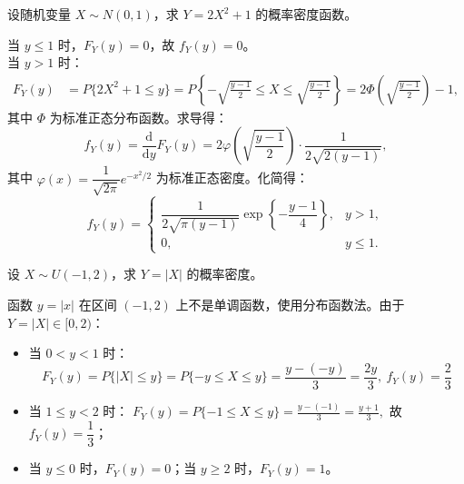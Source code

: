 \documentclass[lang=cn,11pt]{elegantbook}
\begin{document}
\begin{exercise}[正态分布平方变换] 
设随机变量 $X\sim N(0,1)$，求 $Y=2X^2+1$ 的概率密度函数。
\end{exercise}
\begin{solution}
当 $y\leqslant1$ 时，$F_Y(y)=0$，故 $f_Y(y)=0$。\\
当 $y>1$ 时：
\[
\begin{aligned}
F_Y(y) &= P\{2X^2+1\leqslant y\} = P\left\{-\sqrt{\frac{y-1}{2}}\leqslant X\leqslant\sqrt{\frac{y-1}{2}}\right\} = 2\Phi\left(\sqrt{\frac{y-1}{2}}\right)-1,
\end{aligned}
\]
其中 $\Phi$ 为标准正态分布函数。求导得：
\[
f_Y(y) = \frac{\mathrm{d}}{\mathrm{d}y}F_Y(y) = 2\varphi\left(\sqrt{\frac{y-1}{2}}\right)\cdot\frac{1}{2\sqrt{2(y-1)}},
\]
其中 $\varphi(x)=\dfrac{1}{\sqrt{2\pi}}e^{-x^2/2}$ 为标准正态密度。化简得：
\[
f_Y(y) =
\begin{cases}
\dfrac{1}{2\sqrt{\pi(y-1)}}\exp\left\{-\dfrac{y-1}{4}\right\}, & y>1, \\[8pt]
0, & y\leqslant1.
\end{cases}
\]
\end{solution}

\begin{exercise}[均匀分布绝对值变换] \label{exer:2-51}
设 $X\sim U(-1,2)$，求 $Y=|X|$ 的概率密度。
\end{exercise}
\begin{solution}
函数 $y=|x|$ 在区间 $(-1,2)$ 上不是单调函数，使用分布函数法。由于 $Y=|X|\in[0,2)$：
\begin{itemize}
    \item 当 $0<y<1$ 时：
    \[
    F_Y(y) = P\{|X|\leqslant y\} = P\{-y\leqslant X\leqslant y\} = \frac{y-(-y)}{3} = \frac{2y}{3},~f_Y(y)=\dfrac{2}{3}
    \]
    \item 当 $1\leqslant y<2$ 时：
    \(
    F_Y(y) = P\{-1\leqslant X\leqslant y\} = \frac{y-(-1)}{3} = \frac{y+1}{3},
    \)
    故 $f_Y(y)=\dfrac{1}{3}$；
    \item 当 $y\leqslant0$ 时，$F_Y(y)=0$；当 $y\geqslant2$ 时，$F_Y(y)=1$。
\end{itemize}
\end{solution}
\end{document}
